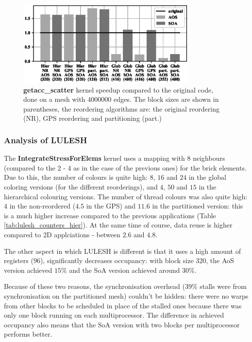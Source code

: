\begin{figure}[Htbp]
  \centering
  \includegraphics[width=9cm]{fig/bookleaf_speedup.eps}
  \caption{\textbf{getacc\_scatter} kernel speedup compared to the original
  code, done on a mesh with $4000000$ edges. The block sizes are shown in
  parentheses, the reordering algorithms are: the original reordering (NR), GPS
  reordering and partitioning (part.)}
  \label{fig:bookleaf_speedup}
\end{figure}

\subsubsection{Analysis of LULESH}\label{sec:analysis-of-lulesh}


The \textbf{IntegrateStressForElems} kernel uses a mapping with 8 neighbours
(compared to the 2 - 4 as in the case of the previous ones) for the brick elements. Due to this, the number of colours is quite high: $8$, $16$ and $24$ in the
global coloring versions (for the different reorderings), and $4$, $50$ and $15$
in the hierarchical colouring versions. The number of thread colours was also
quite high: $4$ in the non-reordered ($4.5$ in the GPS) and $11.6$ in the
partitioned version: this is a much higher increase compared to the previous
applications (Table \ref{tab:lulesh_counters_hier}). At the same time of course, data reuse is higher compared to 2D applciations - between $2.6$ and $4.8$.

The other aspect in which LULESH is different is that it uses a high amount of
registers ($96$), significantly decreases occupancy: with block size 320, the
AoS version achieved $15\%$ and the SoA version achieved around $30\%$.

Because of these two reasons, the synchronisation overhead ($39\%$ stalls were
from synchronisation on the partitioned mesh) couldn't be hidden: there were no
warps from other blocks to be scheduled in place of the stalled ones because
there was only one block running on each multiprocessor. The difference in
achieved occupancy also means that the SoA version with two blocks per
multiprocessor performs better.

